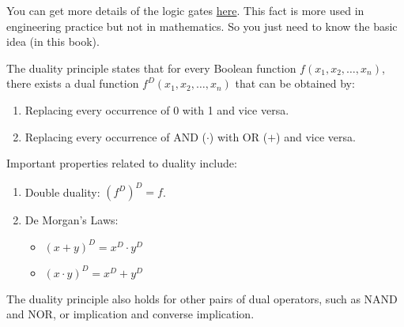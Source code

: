     \begin{remark}
        You can get more details of the logic gates \href{https://www.wikiwand.com/simple/Logic_gate}{here}. This fact is more used in engineering practice but not in mathematics. So you
        just need to know the basic idea (in this book).
    \end{remark}

    \begin{definition}  
        The duality principle states that for every Boolean function $f(x_1, x_2, \ldots, x_n)$, there exists a dual function $f^D(x_1, x_2, \ldots, x_n)$ that can be obtained by:
        \begin{enumerate}
            \item Replacing every occurrence of 0 with 1 and vice versa.
            \item Replacing every occurrence of AND ($\cdot$) with OR ($+$) and vice versa.
        \end{enumerate}
        Important properties related to duality include:
        \begin{enumerate}
            \item Double duality: $(f^D)^D = f$.
            \item De Morgan's Laws:
            \begin{itemize}
                \item $(x + y)^D = x^D \cdot y^D$
                \item $(x \cdot y)^D = x^D + y^D$
            \end{itemize}
        \end{enumerate}

        The duality principle also holds for other pairs of dual operators, such as NAND and NOR, or implication and converse implication.
    \end{definition}    
    
